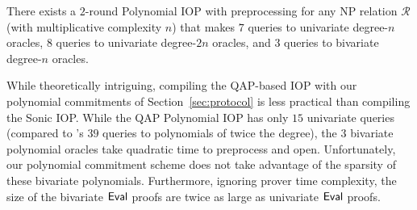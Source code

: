 \begin{theorem}
There exists a $2$-round Polynomial IOP with preprocessing for any NP relation $\mathcal{R}$ (with multiplicative complexity $n$) that makes $7$ queries to univariate degree-$n$ oracles, $8$ queries to univariate degree-$2n$ oracles, and $3$ queries to bivariate degree-$n$ oracles.  
\end{theorem}
 
While theoretically intriguing, compiling the QAP-based IOP with our polynomial commitments of Section~\ref{sec:protocol} is less practical than compiling the \textsf{Sonic} IOP. While the QAP Polynomial IOP has only $15$ univariate queries (compared to 's $39$ queries to polynomials of twice the degree), the $3$ bivariate polynomial oracles take quadratic time to preprocess and open. Unfortunately, our polynomial commitment scheme does not take advantage of the sparsity of these bivariate polynomials. Furthermore, ignoring prover time complexity, the size of the bivariate $\textsf{{Eval}}$ proofs are twice as large as univariate $\textsf{{Eval}}$ proofs.%